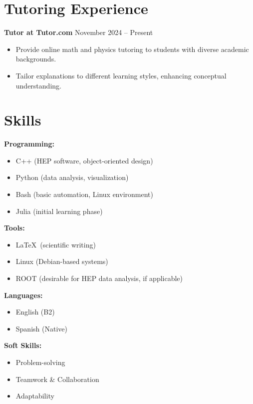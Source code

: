 \documentclass[a4paper,11pt]{article}
\begin{document}
\section*{Tutoring Experience}
\textbf{Tutor at Tutor.com} \hfill November 2024 -- Present
\begin{itemize}
    \item Provide online math and physics tutoring to students with diverse academic backgrounds.
    \item Tailor explanations to different learning styles, enhancing conceptual understanding.
\end{itemize}

\section*{Skills}
\begin{multicols}{2}
\textbf{Programming:} 
\begin{itemize}
    \item C++ (HEP software, object-oriented design)
    \item Python (data analysis, visualization)
    \item Bash (basic automation, Linux environment)
    \item Julia (initial learning phase)
\end{itemize}

\columnbreak

\textbf{Tools:}
\begin{itemize}
    \item \LaTeX\ (scientific writing)
    \item Linux (Debian-based systems)
    \item ROOT (desirable for HEP data analysis, if applicable)
\end{itemize}

\textbf{Languages:}
\begin{itemize}
    \item English (B2)
    \item Spanish (Native)
\end{itemize}

\textbf{Soft Skills:}
\begin{itemize}
    \item Problem-solving
    \item Teamwork \& Collaboration
    \item Adaptability
\end{itemize}

\end{multicols}

\end{document}
